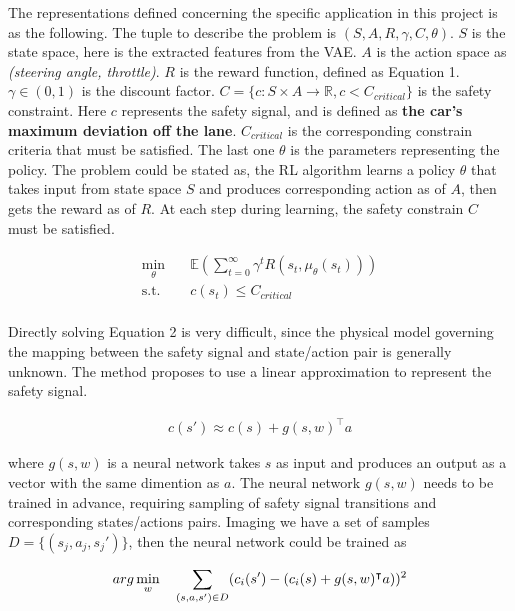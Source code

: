 \documentclass{article} %
\begin{document}
The representations defined concerning the specific application in this project is as the following. The tuple to describe the problem is $(S, A, R, \gamma, C, \theta)$. $S$ is the state space, here is the extracted features from the VAE. $A$ is the action space as \textit{(steering angle, throttle)}. $R$ is the reward function, defined as Equation 1. $\gamma \in (0, 1)$ is the discount factor. $C=\{c: S \times A \rightarrow \mathbb{R}, c < C_{critical} \}$ is the safety constraint. Here $c$ represents the safety signal, and is defined as \textbf{the car's maximum deviation off the lane}. $C_{critical}$ is the corresponding constrain criteria that must be satisfied. The last one $\theta$ is the parameters representing the policy. The problem could be stated as, the RL algorithm learns a policy $\theta$ that takes input from state space $S$ and produces corresponding action as of $A$, then gets the reward as of $R$. At each step during learning, the safety constrain $C$ must be satisfied.

\begin{equation}
\begin{aligned}
\min_{\theta} \quad & \mathbb{E}(\sum_{t=0}^\infty \gamma^t R(s_t, \mu_{\theta}(s_t)) )\\
\textrm{s.t.} \quad & c(s_t) \leq C_{critical}\\
\end{aligned}
\end{equation}

Directly solving Equation 2 is very difficult, since the physical model governing the mapping between the safety signal and state/action pair is generally unknown. The method proposes to use a linear approximation to represent the safety signal.

\begin{equation}
\begin{aligned}
c(s') \approx c(s) + g(s, w)^\intercal a
\end{aligned}
\end{equation}

where $g(s, w)$ is a neural network takes $s$ as input and produces an output as a vector with the same dimention as $a$. The neural network $g(s, w)$ needs to be trained in advance, requiring sampling of safety signal transitions and corresponding states/actions pairs. Imaging we have a set of samples $D = \{(s_j, a_j, s_j')\}$, then the neural network could be trained as

\begin{equation}
arg \min_{w} \quad \sum_{(s, a, s')\in D} (c_i(s') - (c_i(s) + g(s, w)^\intercal a))^2\\
\end{equation}
\end{document}
